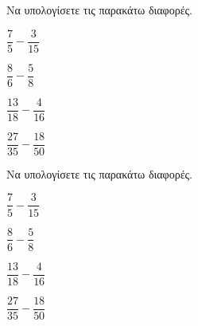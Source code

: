 Να υπολογίσετε τις παρακάτω διαφορές.
\begin{multicols}{2}
\begin{rlist}
\item $ \dfrac{7}{5}-\dfrac{3}{15} $
\item $ \dfrac{8}{6}-\dfrac{5}{8} $
\item $ \dfrac{13}{18}-\dfrac{4}{16} $
\item $ \dfrac{27}{35}-\dfrac{18}{50} $
\end{rlist}
\end{multicols}
Να υπολογίσετε τις παρακάτω διαφορές.
\begin{multicols}{2}
\begin{rlist}
\item $ \dfrac{7}{5}-\dfrac{3}{15} $
\item $ \dfrac{8}{6}-\dfrac{5}{8} $
\item $ \dfrac{13}{18}-\dfrac{4}{16} $
\item $ \dfrac{27}{35}-\dfrac{18}{50} $
\end{rlist}
\end{multicols}
